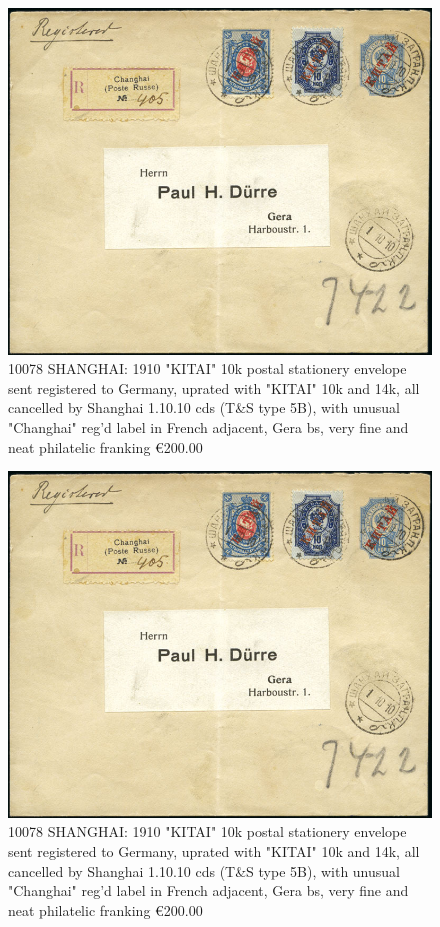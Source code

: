\begin{figure}[htbp]
\centering
\includegraphics[width=.95\textwidth]{../russian-post-offices-in-china/10078.jpg}
\caption{
10078	SHANGHAI: 1910 "KITAI" 10k postal stationery envelope sent registered
to Germany, uprated with "KITAI" 10k and 14k, all cancelled by Shanghai 1.10.10 cds
(T\&S type 5B), with unusual "Changhai" reg'd label in French adjacent,
Gera bs, very fine and neat philatelic franking
\euro 200.00
}  
\end{figure} 

\begin{figure}[htbp]
\centering
\includegraphics[width=.95\textwidth]{../russian-post-offices-in-china/10078.jpg}
\caption{
10078	SHANGHAI: 1910 "KITAI" 10k postal stationery envelope 
sent registered to Germany, uprated with "KITAI" 10k and 14k, 
all cancelled by Shanghai 1.10.10 cds (T\&S type 5B), with unusual 
"Changhai" reg'd label in French adjacent, Gera bs, very fine and neat 
philatelic franking
\euro 200.00
}  
\end{figure}


